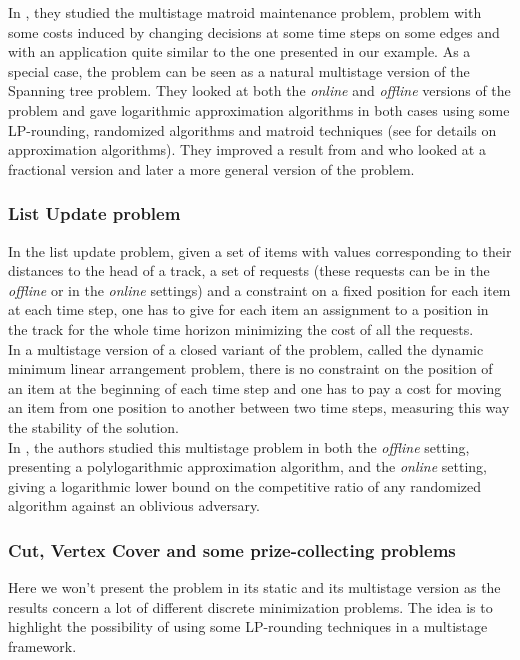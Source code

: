 \documentclass[a4paper]{book}
\begin{document}
In \cite{Gupta}, they studied the {\sc multistage matroid maintenance} problem, problem with some costs induced by changing decisions at some time steps on some edges and with an application quite similar to the one presented in our example. As a special case, the problem can be seen as a natural multistage version of the {\sc Spanning tree} problem.  They looked at both the \emph{online} and \emph{offline} versions of the problem and gave logarithmic approximation algorithms in both cases using some LP-rounding, randomized algorithms and matroid techniques (see \cite{vazirani2013approximation} for details on approximation algorithms). They improved a result from \cite{buchbinder2012unified} and \cite{buchbinder2014competitive} who looked at a fractional version and later a more general version of the problem. 





\subsubsection{List Update problem}
In the {\sc list update} problem, given a set of items with values corresponding to their distances to the head of a track, a set of requests (these requests can be in the \textit{offline} or in the \textit{online} settings) and a constraint on a fixed position for each item at each time step, one has to give for each item an assignment to a position in the track for the whole time horizon minimizing the cost of all the requests. \\
In a multistage version of a closed variant of the problem, called the {\sc dynamic minimum linear arrangement} problem, there is no constraint on the position of an item at the beginning of each time step and one has to pay a cost for moving an item from one position to another between two time steps, measuring this way the stability of the solution.\\

In \cite{olver2018itinerant}, the authors studied this multistage problem in both the \emph{offline} setting, presenting a polylogarithmic approximation algorithm, and the  \emph{online} setting, giving a logarithmic lower bound on the competitive ratio of any randomized algorithm against an oblivious adversary. 

\subsubsection{Cut, Vertex Cover and some prize-collecting problems}
Here we won't present the problem in its static and its multistage version as the results concern a lot of different discrete minimization problems. The idea is to highlight the possibility of using some LP-rounding techniques in a multistage framework.\\
\end{document}
